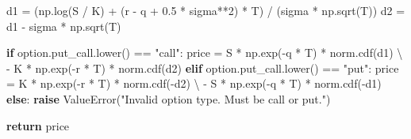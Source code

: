 \documentclass[
  letterpaper,
  DIV=11,
  numbers=noendperiod]{scrartcl}
\newenvironment{Shaded}{\begin{snugshade}}{\end{snugshade}}
\newcommand{\ControlFlowTok}[1]{\textcolor[rgb]{0.00,0.23,0.31}{\textbf{#1}}}
\newcommand{\DecValTok}[1]{\textcolor[rgb]{0.68,0.00,0.00}{#1}}
\newcommand{\FloatTok}[1]{\textcolor[rgb]{0.68,0.00,0.00}{#1}}
\newcommand{\NormalTok}[1]{\textcolor[rgb]{0.00,0.23,0.31}{#1}}
\newcommand{\OperatorTok}[1]{\textcolor[rgb]{0.37,0.37,0.37}{#1}}
\newcommand{\PreprocessorTok}[1]{\textcolor[rgb]{0.68,0.00,0.00}{#1}}
\newcommand{\StringTok}[1]{\textcolor[rgb]{0.13,0.47,0.30}{#1}}
\begin{document}
\begin{Shaded}
\begin{Highlighting}[]
\NormalTok{    d1 }\OperatorTok{=}\NormalTok{ (np.log(S }\OperatorTok{/}\NormalTok{ K) }\OperatorTok{+}\NormalTok{ (r }\OperatorTok{{-}}\NormalTok{ q }\OperatorTok{+} \FloatTok{0.5} \OperatorTok{*}\NormalTok{ sigma}\OperatorTok{**}\DecValTok{2}\NormalTok{) }\OperatorTok{*}\NormalTok{ T) }\OperatorTok{/}\NormalTok{ (sigma }\OperatorTok{*}\NormalTok{ np.sqrt(T))}
\NormalTok{    d2 }\OperatorTok{=}\NormalTok{ d1 }\OperatorTok{{-}}\NormalTok{ sigma }\OperatorTok{*}\NormalTok{ np.sqrt(T)}

    \ControlFlowTok{if}\NormalTok{ option.put\_call.lower() }\OperatorTok{==} \StringTok{"call"}\NormalTok{:}
\NormalTok{        price }\OperatorTok{=}\NormalTok{ S }\OperatorTok{*}\NormalTok{ np.exp(}\OperatorTok{{-}}\NormalTok{q }\OperatorTok{*}\NormalTok{ T) }\OperatorTok{*}\NormalTok{ norm.cdf(d1) }\OperatorTok{\textbackslash{}}
                \OperatorTok{{-}}\NormalTok{ K }\OperatorTok{*}\NormalTok{ np.exp(}\OperatorTok{{-}}\NormalTok{r }\OperatorTok{*}\NormalTok{ T) }\OperatorTok{*}\NormalTok{ norm.cdf(d2)}
    \ControlFlowTok{elif}\NormalTok{ option.put\_call.lower() }\OperatorTok{==} \StringTok{"put"}\NormalTok{:}
\NormalTok{        price }\OperatorTok{=}\NormalTok{ K }\OperatorTok{*}\NormalTok{ np.exp(}\OperatorTok{{-}}\NormalTok{r }\OperatorTok{*}\NormalTok{ T) }\OperatorTok{*}\NormalTok{ norm.cdf(}\OperatorTok{{-}}\NormalTok{d2) }\OperatorTok{\textbackslash{}}
                \OperatorTok{{-}}\NormalTok{ S }\OperatorTok{*}\NormalTok{ np.exp(}\OperatorTok{{-}}\NormalTok{q }\OperatorTok{*}\NormalTok{ T) }\OperatorTok{*}\NormalTok{ norm.cdf(}\OperatorTok{{-}}\NormalTok{d1)}
    \ControlFlowTok{else}\NormalTok{:}
        \ControlFlowTok{raise} \PreprocessorTok{ValueError}\NormalTok{(}\StringTok{"Invalid option type. Must be \textquotesingle{}call\textquotesingle{} or \textquotesingle{}put\textquotesingle{}."}\NormalTok{)}

    \ControlFlowTok{return}\NormalTok{ price}


\end{Highlighting}
\end{Shaded}
\end{document}
